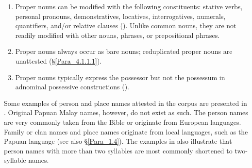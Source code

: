 \begin{enumerate}
\item 
Proper nouns can be modified with the following constituents:  stative verbs, personal pronouns, demonstratives, locatives, interrogatives, numerals, quantifiers, and/or relative clauses (). Unlike common nouns, they are not readily modified with other nouns,  phrases, or prepositional phrases.

\item 
Proper nouns always occur as bare nouns; reduplicated proper nouns are unattested (§\ref{Para_4.1.1.1}).

\item 
Proper nouns typically express the possessor but not the possessum in adnominal possessive constructions ().

\end{enumerate}

Some examples of person and place names attested in the corpus are presented in . Original Papuan Malay names, however, do not exist as such. The person names are very commonly taken from the Bible or originate from European languages. Family or clan names and place names originate from local languages, such as the Papuan language  (see also §\ref{Para_1.4}). The examples in  also illustrate that person names with more than two syllables are most commonly shortened to two-syllable names.


